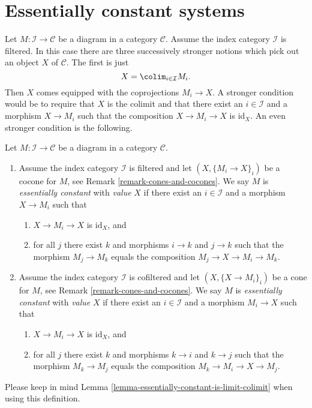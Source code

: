 \section{Essentially constant systems}
\label{section-essentially-constant}

\noindent
Let $M : \mathcal{I} \to \mathcal{C}$ be a diagram in a category $\mathcal{C}$.
Assume the index category $\mathcal{I}$ is filtered. In this case
there are three successively stronger notions which pick out an object
$X$ of $\mathcal{C}$. The first is just
$$
X = \colim_{i \in \mathcal{I}} M_i.
$$
Then $X$ comes equipped with the coprojections $M_i \to X$.
A stronger condition would be to require that $X$ is the colimit and
that there exist an $i \in \mathcal{I}$ and a morphism $X \to M_i$ such
that the composition $X \to M_i \to X$ is $\text{id}_X$. An even
stronger condition is the following.

\begin{definition}
\label{definition-essentially-constant-diagram}
Let $M : \mathcal{I} \to \mathcal{C}$ be a diagram in a category
$\mathcal{C}$.
\begin{enumerate}
\item Assume the index category $\mathcal{I}$ is filtered and
let $(X, \{M_i \to X\}_i)$ be a cocone for $M$, see
Remark \ref{remark-cones-and-cocones}. We say $M$ is
{\it essentially constant} with {\it value} $X$ if there exist an
$i \in \mathcal{I}$ and a morphism $X \to M_i$ such that
\begin{enumerate}
\item $X \to M_i \to X$ is $\text{id}_X$, and
\item for all $j$ there exist $k$ and morphisms $i \to k$ and $j \to k$
such that the morphism $M_j \to M_k$ equals the composition
$M_j \to X \to M_i \to M_k$.
\end{enumerate}
\item Assume the index category $\mathcal{I}$ is cofiltered and let
$(X, \{X \to M_i\}_i)$ be a cone for $M$, see
Remark \ref{remark-cones-and-cocones}. We say
$M$ is {\it essentially constant} with {\it value} $X$ if
there exist an $i \in \mathcal{I}$
and a morphism $M_i \to X$ such that
\begin{enumerate}
\item $X \to M_i \to X$ is $\text{id}_X$, and
\item for all $j$ there exist $k$ and morphisms $k \to i$ and $k \to j$
such that the morphism $M_k \to M_j$ equals the composition
$M_k \to M_i \to X \to M_j$.
\end{enumerate}
\end{enumerate}
Please keep in mind Lemma \ref{lemma-essentially-constant-is-limit-colimit}
when using this definition.
\end{definition}

